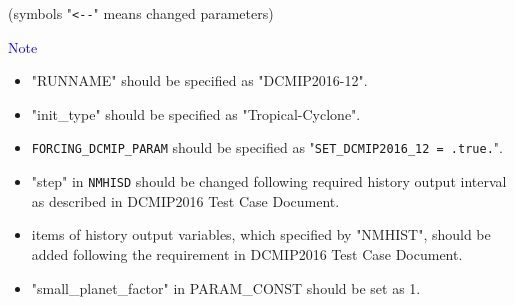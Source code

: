  (symbols "\verb|<--|" means changed parameters)

 \noindent \textcolor{blue}{{\sf Note}}
 \begin{itemize}
   \item "RUNNAME" should be specified as "DCMIP2016-12".
   \item "init\_type" should be specified as "Tropical-Cyclone".
   \item \verb|FORCING_DCMIP_PARAM| should be specified as "\verb|SET_DCMIP2016_12 = .true.|".
   \item "step" in \verb|NMHISD| should be changed following required history output interval
           as described in DCMIP2016 Test Case Document.
   \item items of history output variables, which specified by "NMHIST", should be added
         following the requirement in DCMIP2016 Test Case Document.
   \item "small\_planet\_factor" in PARAM\_CONST should be set as 1.
 \end{itemize}


